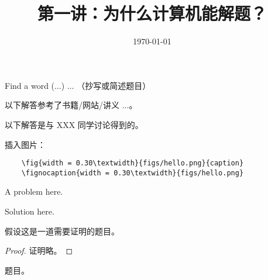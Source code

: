 \documentclass[11pt, a4paper, UTF8]{ctexart}
\title{第一讲：为什么计算机能解题？}
\date{\today}
\begin{document}
\maketitle
\noplagiarism
\beginthishw	%

\begin{problem}[UD: 1.2]	%
  Find a word ($\ldots$) $\ldots$ （抄写或简述题目）
\end{problem}

\begin{remark}	%
  以下解答参考了书籍/网站/讲义 $\ldots$。

  \noindent 以下解答是与 XXX 同学讨论得到的。
\end{remark}

\begin{solution}
  插入图片：
  \begin{verbatim}
    \fig{width = 0.30\textwidth}{figs/hello.png}{caption}
    \fignocaption{width = 0.30\textwidth}{figs/hello.png}
  \end{verbatim}
\end{solution}

\begin{problem}[UD: 1.3]
  A problem here.
\end{problem}

\begin{solution}
  Solution here.
\end{solution}
\newpage  %
\begin{problem}[UD: x.x]
  假设这是一道需要证明的题目。	
\end{problem}


\begin{proof}
  证明略。	
\end{proof}
\begincorrection	%

\begin{problem}[题号]
  题目。
\end{problem}
\end{document}
